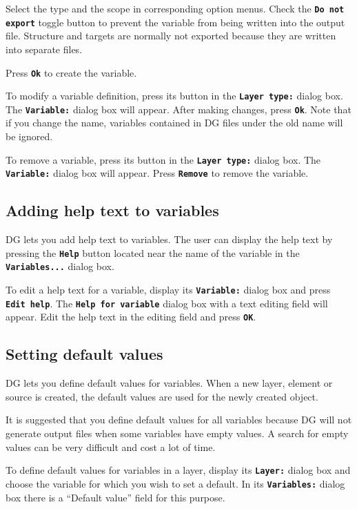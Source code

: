 \documentclass[12pt]{report}
\begin{document}
Select the type and the scope in corresponding option menus. Check the
\textbf{\texttt{Do not export}} toggle button to prevent the variable
from being written into the output file. Structure and targets are
normally not exported because they are written into separate files.

Press \textbf{\texttt{Ok}} to create the variable.

To modify a variable definition, press its button in the
\textbf{\texttt{Layer type:}} dialog box. The
\textbf{\texttt{Variable:}} dialog box will appear. After making
changes, press \textbf{\texttt{Ok}}. Note that if you change the name,
variables contained in DG files under the old name will be ignored.

To remove a variable, press its button in the \textbf{\texttt{Layer
type:}} dialog box. The \textbf{\texttt{Variable:}}
dialog box will appear. Press \textbf{\texttt{Remove}} to remove the
variable.

\subsection{Adding help text to variables}

DG lets you add help text to variables. The user can display the help
text by pressing the \textbf{\texttt{Help}} button located near the name
of the variable in the \textbf{\texttt{Variables...}} dialog box.

To edit a help text for a variable, display its
\textbf{\texttt{Variable:}} dialog box and press
\textbf{\texttt{Edit help}}. The \textbf{\texttt{Help for variable}} dialog
box with a text editing field will appear. Edit the help text in
the editing field and press \textbf{\texttt{OK}}.

\subsection{Setting default values}

DG lets you define default values for variables. When a new layer,
element or source is created, the default values are used for the newly
created object.

It is suggested that you define default values for all variables
because DG will not generate output files when some variables have
empty values. A search for empty values can be very difficult and cost
a lot of time.


To define default values for variables in a layer, display its
\textbf{\texttt{Layer:}} dialog box and
choose the variable for which you wish to set a default.
In its \textbf{\texttt{Variables:}} dialog box there is a
``Default value'' field for this purpose.
\end{document}
